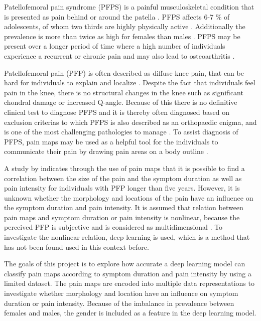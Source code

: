Patellofemoral pain syndrome (PFPS) is a painful musculoskeletal condition that is presented as pain behind or around the patella \citep{Maclachlan2017, Smith2015}. PFPS affects 6-7 \% of adolescents, of whom two thirds are highly physically active \citep{Rathleff2015}. Additionally the prevalence is more than twice as high for females than males \citep{Rathleff2015, Petersen2013}.
PFPS may be present over a longer period of time where a high number of individuals experience a recurrent or chronic pain \citep{Witvrouw2014} and may also lead to osteoarthritis \citep{Petersen2013, Crossley2016}.

\noindent
Patellofemoral pain (PFP) is often described as diffuse knee pain, that can be hard for individuals to explain and localize \citep{Witvrouw2014}. Despite the fact that individuals feel pain in the knee, there is no structural changes in the knee such as significant chondral damage or increased Q-angle. Because of this there is no definitive clinical test to diagnose PFPS and it is thereby often diagnosed based on exclusion criterias \citep{Petersen2013} to which PFPS is also described as an orthopaedic enigma, and is one of the most challenging pathologies to manage \citep{Dye2001}.
To assist diagnosis of PFPS, pain maps may be used as a helpful tool for the individuals to communicate their pain by drawing pain areas on a body outline \citep{Boudreau2016}. 

\noindent
A study by \citeauthor{Boudreau2017} indicates through the use of pain maps that it is possible to find a correlation between the size of the pain and the symptom duration as well as pain intensity for individuals with PFP longer than five years.\citep{Boudreau2017} However, it is unknown whether the morphology and locations of the pain have an influence on the symptom duration and pain intensity. 
It is assumed that relation between pain maps and symptom duration or pain intensity is nonlinear, because the perceived PFP is subjective and is considered as multidimensional \citep{Dansie2013}. To investigate the nonlinear relation, deep learning is used, which is a method that has not been found used in this context before.

\noindent
The goals of this project is to explore how accurate a deep learning model can classify pain maps according to symptom duration and pain intensity by using a limited dataset. The pain maps are encoded into multiple data representations to investigate whether morphology and location have an influence on symptom duration or pain intensity. Because of the imbalance in prevalence between females and males, the gender is included as a feature in the deep learning model. \newline

